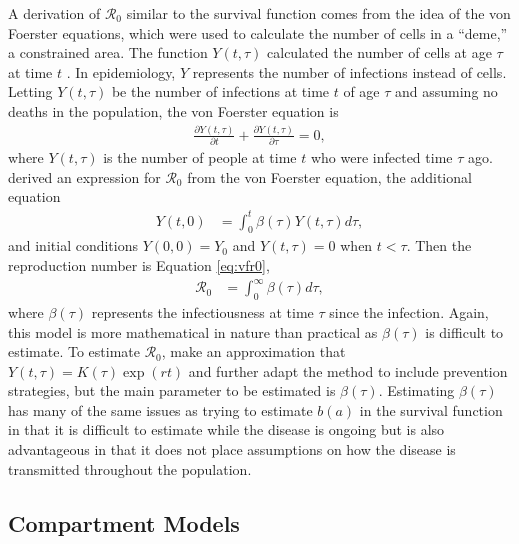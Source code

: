\documentclass[12pt]{article}
\newcommand{\rr}{\ensuremath{\mathcal{R}_0}}
\begin{document}
A derivation of $\rr$ similar to the survival function comes from the idea of the von Foerster equations, which were used to calculate the number of cells in a ``deme,'' a constrained area.  The function $Y(t, \tau)$ calculated the number of cells at age $\tau$ at time $t$ \citep{trucco1965}.  In epidemiology, $Y$ represents the number of infections instead of cells. Letting $Y(t, \tau)$ be the number of infections at time $t$ of age $\tau$ and assuming no deaths in the population, the von Foerster equation is
\begin{align*}
  \frac{\partial Y(t, \tau)}{\partial t} +   \frac{\partial Y(t, \tau)}{\partial \tau} = 0,
\end{align*}
where $Y(t,\tau)$ is the number of people at time $t$ who were infected time $\tau$ ago.    \cite{fraser2004factors} derived an expression for $\rr$ from the von Foerster equation, the additional equation
\begin{align*}
  Y(t,0) &= \int_0^t \beta( \tau) Y(t, \tau) d \tau,
\end{align*}
and initial conditions $Y(0,0) = Y_0$ and $Y(t, \tau) = 0$ when $t < \tau$.  Then the reproduction number is Equation \ref{eq:vfr0},
\begin{align}\label{eq:vfr0}
\rr &= \int_0^\infty \beta(\tau) d\tau,
\end{align}
 where $\beta (\tau)$ represents the infectiousness at time $\tau$ since the infection.    Again, this model is more mathematical in nature than practical as $\beta (\tau)$ is difficult to estimate.  To estimate $\rr$, \cite{fraser2004factors} make an approximation that $Y(t, \tau) = K(\tau) \exp (rt)$ and further adapt the method to include prevention strategies, but the main parameter to be estimated is $\beta (\tau)$.  Estimating $\beta (\tau)$ has many of the same issues as trying to estimate $b(a)$ in the survival function in that it is difficult to estimate while the disease is ongoing but is also advantageous in that it does not place assumptions on how the disease is transmitted throughout the population.





\subsection{Compartment Models}
\label{sec:cms}
\end{document}
